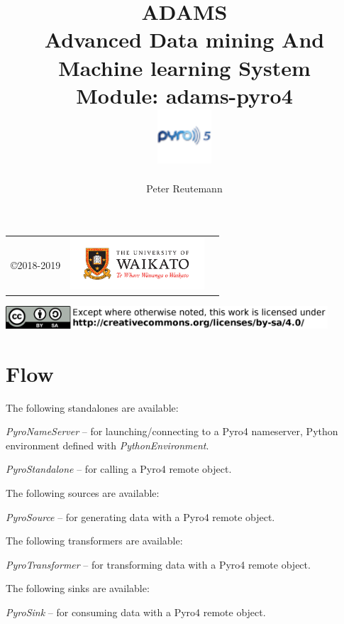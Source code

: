 \documentclass[a4paper]{book}
\title{
  \textbf{ADAMS} \\
  {\Large \textbf{A}dvanced \textbf{D}ata mining \textbf{A}nd \textbf{M}achine
  learning \textbf{S}ystem} \\
  {\Large Module: adams-pyro4} \\
  \vspace{1cm}
  \includegraphics[width=2cm]{images/pyro5-module.png} \\
}
\author{
  Peter Reutemann
}
\begin{document}
\begin{titlepage}
\maketitle

\thispagestyle{empty}
\center
\begin{table}[b]
	\begin{tabular}{c l l}
		\parbox[c][2cm]{2cm}{\copyright 2018-2019} &
		\parbox[c][2cm]{5cm}{\includegraphics[width=5cm]{images/coat_of_arms.pdf}}
	\end{tabular}
	\includegraphics[width=12cm]{images/cc.png} \\
\end{table}

\end{titlepage}

\tableofcontents

\chapter{Flow}

The following standalones are available:
\begin{tight_itemize}
  \item \textit{PyroNameServer} -- for launching/connecting to a Pyro4\cite{pyro4} nameserver, Python environment
  defined with \textit{PythonEnvironment}.
  \item \textit{PyroStandalone} -- for calling a Pyro4\cite{pyro4} remote object.
\end{tight_itemize}

The following sources are available:
\begin{tight_itemize}
  \item \textit{PyroSource} -- for generating data with a Pyro4\cite{pyro4} remote object.

\end{tight_itemize}

The following transformers are available:
\begin{tight_itemize}
  \item \textit{PyroTransformer} -- for transforming data with a Pyro4\cite{pyro4} remote object.
\end{tight_itemize}

The following sinks are available:
\begin{tight_itemize}
  \item \textit{PyroSink} -- for consuming data with a Pyro4\cite{pyro4} remote object.
\end{tight_itemize}



\end{document}
